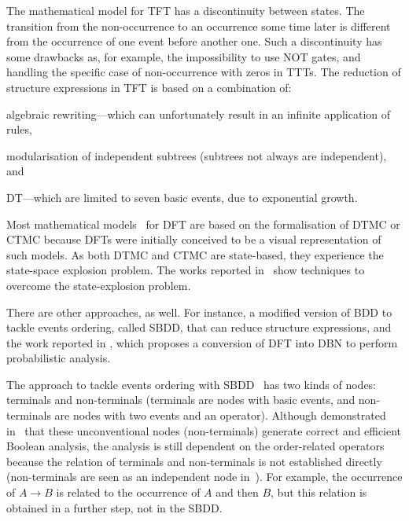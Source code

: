 The mathematical model for \ac{TFT} has a discontinuity between states.
The transition from the non-occurrence to an occurrence some time later is different from the occurrence of one event before another one.
Such a discontinuity has some drawbacks as, for example, the impossibility to use \ac{NOT} gates, and handling the specific case of non-occurrence with zeros in \acp{TTT}.
The reduction of structure expressions in \ac{TFT} is based on a combination of:
\begin{alineasinline}
  \item algebraic rewriting---which can unfortunately result in an infinite application of rules,
  \item modularisation of independent subtrees (subtrees not always are independent), and
  \item \ac{DT}---which are limited to seven basic events, due to exponential growth.
\end{alineasinline}


\begin{sloppypar}
Most mathematical models~\cite{LHT2013,CSD2000,BRM+2005} for \ac{DFT} are based on the formalisation of \ac{DTMC} or \ac{CTMC} because \acp{DFT} were initially conceived to be a visual representation of such models.
As both \ac{DTMC} and \ac{CTMC} are state-based, they experience the state-space explosion problem.
The works reported in~\cite{BKK+2003,BHH+2003,SAE1996b} show techniques to overcome the state-explosion problem.
\end{sloppypar}

There are other approaches, as well.
For instance, a modified version of \ac{BDD} to tackle events ordering, called \acf{SBDD}, that can reduce structure expressions, and the work reported in \cite{BRM+2005}, which proposes a conversion of \ac{DFT} into \ac{DBN} to perform probabilistic analysis.

The approach to tackle events ordering with \ac{SBDD}~\cite{XTD2012} has two kinds of nodes: terminals and non-terminals (terminals are nodes with basic events, and non-terminals are nodes with two events and an operator).
Although demonstrated in~\cite{Bryant1986} that these unconventional nodes (non-terminals) generate correct and efficient Boolean analysis, the analysis is still dependent on the order-related operators because the relation of terminals and non-terminals is not established directly (non-terminals are seen as an independent node in~\cite{XTD2012}).
For example, the occurrence of $A \rightarrow B$ is related to the occurrence of $A$ and then $B$, but this relation is obtained in a further step, not in the \ac{SBDD}.

